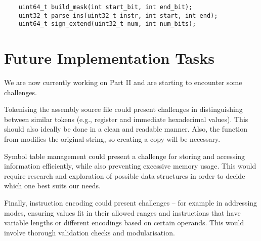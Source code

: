 \documentclass[a4paper, 10pt]{article}
\begin{document}
\begin{verbatim}
    uint64_t build_mask(int start_bit, int end_bit);
    uint32_t parse_ins(uint32_t instr, int start, int end);
    uint64_t sign_extend(uint32_t num, int num_bits);
\end{verbatim}

\section{Future Implementation Tasks}

We are now currently working on Part II and are starting to encounter some challenges.

Tokenising the assembly source file could present challenges in distinguishing between similar tokens (e.g., register and immediate hexadecimal values). This should also ideally be done in a clean and readable manner. Also, the function  from  modifies the original string, so creating a copy will be necessary.

Symbol table management could present a challenge for storing and accessing information efficiently, while also preventing excessive memory usage. This would require research and exploration of possible data structures in order to decide which one best suits our needs.

Finally, instruction encoding could present challenges -- for example in addressing modes, ensuring values fit in their allowed ranges and instructions that have variable lengths or different encodings based on certain operands. This would involve thorough validation checks and modularisation.
\end{document}
